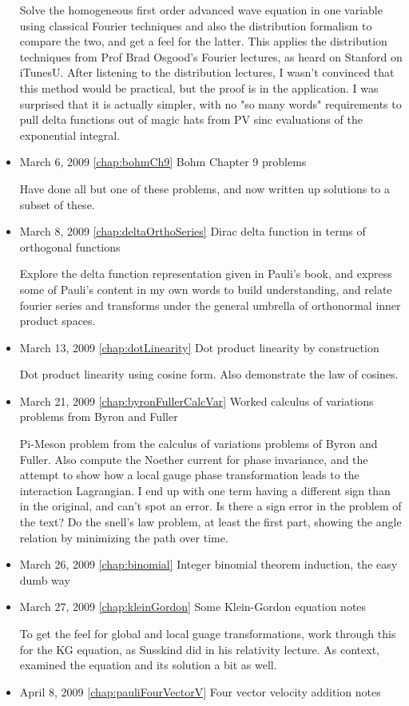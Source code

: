 \begin{itemize}
Solve the homogeneous first order advanced wave equation in one variable using classical Fourier techniques and also the distribution formalism to compare the two, and get a feel for the latter.  This applies the distribution techniques from Prof Brad Osgood's Fourier lectures, as heard on Stanford on iTunesU.  After listening to the distribution lectures, I wasn't convinced that this method would be practical, but the proof is in the application.  I was surprised that it is actually simpler, with no "so many words" requirements to pull delta functions out of magic hats from PV sinc evaluations of the exponential integral. \item March 6, 2009 \ref{chap:bohmCh9} Bohm Chapter 9 problems

Have done all but one of these problems, and now written up solutions to a subset of these. \item March 8, 2009 \ref{chap:deltaOrthoSeries} Dirac delta function in terms of orthogonal functions

Explore the delta function representation given in Pauli's book, and express some of Pauli's content in my own words to build understanding, and relate fourier series and transforms under the general umbrella of orthonormal inner product spaces. \item March 13, 2009 \ref{chap:dotLinearity} Dot product linearity by construction

Dot product linearity using cosine form.  Also demonstrate the law of cosines.\item March 21, 2009 \ref{chap:byronFullerCalcVar} Worked calculus of variations problems from Byron and Fuller

Pi-Meson problem from the calculus of variations problems of Byron and Fuller.  Also compute the Noether current for phase invariance, and the attempt to show how a local gauge phase transformation leads to the interaction Lagrangian.  I end up with one term having a different sign than in the original, and can't spot an error.  Is there a sign error in the problem of the text?   Do the snell's law problem, at least the first part, showing the angle relation by minimizing the path over time.\item March 26, 2009 \ref{chap:binomial} Integer binomial theorem induction, the easy dumb way

\item March 27, 2009 \ref{chap:kleinGordon} Some Klein-Gordon equation notes

To get the feel for global and local guage transformations, work through this for the KG equation, as Susskind did in his relativity lecture.  As context, examined the equation and its solution a bit as well. \item April 8, 2009 \ref{chap:pauliFourVectorV} Four vector velocity addition notes


\end{itemize}
